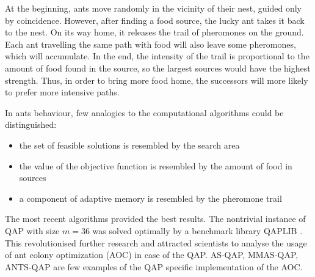 At the beginning, ants move randomly in the vicinity of their nest, guided only by coincidence.
However, after finding a food source, the lucky ant takes it back to the nest.
On its way home, it releases the trail of pheromones on the ground.
Each ant travelling the same path with food will also leave some pheromones, which will accumulate.
In the end, the intensity of the trail is proportional to the amount of food found in the source, so the largest sources would have the highest strength.
Thus, in order to bring more food home, the successors will more likely to prefer more intensive paths.

In ants behaviour, few analogies to the computational algorithms could be distinguished:
\begin{itemize}
  \item the set of feasible solutions is resembled by the search area
  \item the value of the objective function is resembled by the amount of food in sources
  \item a component of adaptive memory is resembled by the pheromone trail
\end{itemize}

The most recent algorithms provided the best results.
The nontrivial instance of QAP with size $ m = 36 $ was solved optimally by a benchmark library QAPLIB \cite{dorigo2004ant}.
This revolutionised further research and attracted scientists to analyse the usage of ant colony optimization (AOC) in case of the QAP.
AS-QAP, MMAS-QAP, ANTS-QAP are few examples of the QAP specific implementation of the AOC.

